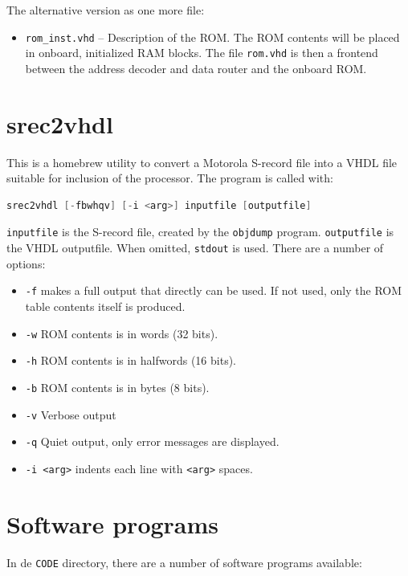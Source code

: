 \documentclass[12pt]{article}
\begin{document}
The alternative version as one more file:

\begin{itemize}
\item \lstinline|rom_inst.vhd| -- Description of the ROM. The ROM contents will be placed in onboard, initialized RAM blocks. The file \lstinline|rom.vhd| is then a frontend between the address decoder and data router and the onboard ROM.
\end{itemize}
\section{srec2vhdl}
This is a homebrew utility to convert a Motorola S-record file into a VHDL file suitable for inclusion of the processor. The program is called with:

\begin{lstlisting}[language=c]
srec2vhdl [-fbwhqv] [-i <arg>] inputfile [outputfile]
\end{lstlisting}

\texttt{inputfile} is the S-record file, created by the \texttt{objdump} program. \texttt{outputfile} is the VHDL outputfile. When omitted, \texttt{stdout} is used. There are a number of options:

\begin{itemize}
\item \texttt{-f} makes a full output that directly can be used. If not used, only the ROM table contents itself is produced.
\item \texttt{-w} ROM contents is in words (32 bits).
\item \texttt{-h} ROM contents is in halfwords (16 bits).
\item \texttt{-b} ROM contents is in bytes (8 bits).
\item \texttt{-v} Verbose output
\item \texttt{-q} Quiet output, only error messages are displayed.
\item \texttt{-i <arg>} indents each line with \texttt{<arg>} spaces.
\end{itemize}

\section{Software programs}
In de \texttt{CODE} directory, there are a number of software programs available:
\end{document}
